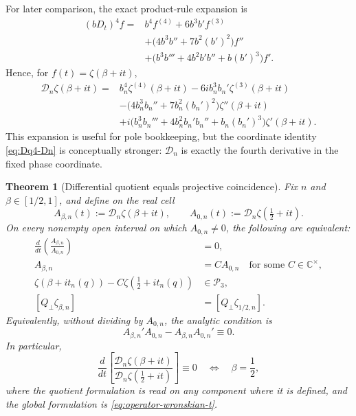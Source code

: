 \documentclass[11pt]{amsart}
\numberwithin{equation}{section}
\newtheorem{theorem}{Theorem}[section]
\newcommand{\C}{\mathbb C}
\newcommand{\Pcal}{\mathcal P}
\begin{document}
For later comparison, the exact product-rule expansion is
\begin{equation}
\boxed{
\begin{aligned}
 (bD_t)^4f={}&b^4f^{(4)}+6b^3b'f^{(3)}\\
 &+\bigl(4b^3b''+7b^2(b')^2\bigr)f''\\
 &+\bigl(b^3b'''+4b^2b'b''+b(b')^3\bigr)f'.
\end{aligned}}
\label{eq:bDt-fourth-expansion}
\end{equation}
Hence, for $f(t)=\zeta(\beta+it)$,
\begin{equation}
\begin{aligned}
 \mathcal D_n\zeta(\beta+it)={}&
 b_n^4\zeta^{(4)}(\beta+it)
 -6i b_n^3b_n'\zeta^{(3)}(\beta+it)\\
 &-\bigl(4b_n^3b_n''+7b_n^2(b_n')^2\bigr)
 \zeta''(\beta+it)\\
 &+i\bigl(b_n^3b_n'''+4b_n^2b_n'b_n''
 +b_n(b_n')^3\bigr)\zeta'(\beta+it).
\end{aligned}
\label{eq:Dn-zeta-expansion}
\end{equation}
This expansion is useful for pole bookkeeping, but the coordinate identity
\eqref{eq:Dq4-Dn} is conceptually stronger: $\mathcal D_n$ is exactly the
fourth derivative in the fixed phase coordinate.

\begin{theorem}[Differential quotient equals projective coincidence]
\label{thm:differential-projective-equivalence}
Fix $n$ and $\beta\in[1/2,1]$, and define on the real cell
\begin{equation}
 A_{\beta,n}(t):=\mathcal D_n\zeta(\beta+it),
 \qquad
 A_{0,n}(t):=\mathcal D_n\zeta(\tfrac12+it).
 \label{eq:A-beta-operator}
\end{equation}
On every nonempty open interval on which $A_{0,n}\neq0$, the following are
equivalent:
\begin{align}
 \frac{d}{dt}\left(\frac{A_{\beta,n}}{A_{0,n}}\right)&=0,
 \label{eq:operator-ratio-zero}\\
 A_{\beta,n}&=C A_{0,n}\quad\text{for some }C\in\C^\times,
 \label{eq:operator-proportional}\\
 \zeta(\beta+i t_n(q))-C\zeta(\tfrac12+i t_n(q))&\in\Pcal_3,
 \label{eq:operator-cubic}\\
 [Q_\perp\zeta_{\beta,n}]&=[Q_\perp\zeta_{1/2,n}].
 \label{eq:operator-projective}
\end{align}
Equivalently, without dividing by $A_{0,n}$, the analytic condition is
\begin{equation}
 \boxed{
 A_{\beta,n}'A_{0,n}-A_{\beta,n}A_{0,n}'\equiv0.
 }
 \label{eq:operator-wronskian-t}
\end{equation}
In particular,
\begin{equation}
 \boxed{
 \frac{d}{dt}\left[
 \frac{\mathcal D_n\zeta(\beta+it)}
 {\mathcal D_n\zeta(\tfrac12+it)}
 \right]\equiv0
 \quad\Longleftrightarrow\quad
 \beta=\frac12,
 }
 \label{eq:operator-selects-half}
\end{equation}
where the quotient formulation is read on any component where it is defined,
and the global formulation is \eqref{eq:operator-wronskian-t}.
\end{theorem}
\end{document}
